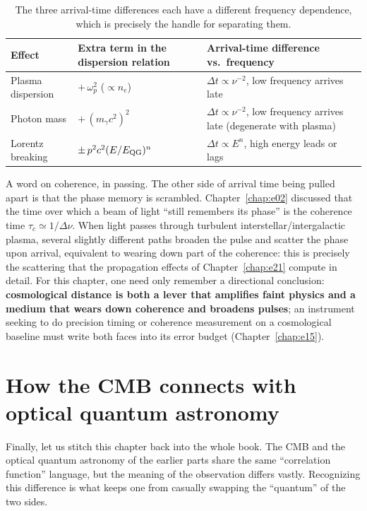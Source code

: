 \begin{table}[tbp]
\centering
\caption{The three arrival-time differences each have a different frequency dependence, which is precisely the handle for separating them.}
\label{tab:e23-delays}
\begin{tabular}{@{}lll@{}}
\toprule
Effect & Extra term in the dispersion relation & Arrival-time difference vs.\ frequency\\
\midrule
Plasma dispersion & \(+\,\omega_p^2\) (\(\propto n_e\)) & \(\Delta t\propto \nu^{-2}\), low frequency arrives late\\
Photon mass & \(+\,(m_\gamma c^2)^2\) & \(\Delta t\propto \nu^{-2}\), low frequency arrives late (degenerate with plasma)\\
Lorentz breaking & \(\pm\,p^2c^2(E/E_{\rm QG})^n\) & \(\Delta t\propto E^{n}\), high energy leads or lags\\
\bottomrule
\end{tabular}
\end{table}

A word on coherence, in passing. The other side of arrival time being pulled apart is that the phase memory is scrambled. Chapter~\ref{chap:e02} discussed that the time over which a beam of light ``still remembers its phase'' is the coherence time \(\tau_c\simeq1/\Delta\nu\). When light passes through turbulent interstellar/intergalactic plasma, several slightly different paths broaden the pulse and scatter the phase upon arrival, equivalent to wearing down part of the coherence: this is precisely the scattering that the propagation effects of Chapter~\ref{chap:e21} compute in detail. For this chapter, one need only remember a directional conclusion: \textbf{cosmological distance is both a lever that amplifies faint physics and a medium that wears down coherence and broadens pulses}; an instrument seeking to do precision timing or coherence measurement on a cosmological baseline must write both faces into its error budget (Chapter~\ref{chap:e15}).

\section{How the CMB connects with optical quantum astronomy}
\label{sec:e23-bridge}

Finally, let us stitch this chapter back into the whole book. The CMB and the optical quantum astronomy of the earlier parts share the same ``correlation function'' language, but the meaning of the observation differs vastly. Recognizing this difference is what keeps one from casually swapping the ``quantum'' of the two sides.

